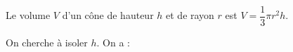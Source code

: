 
Le volume $V$ d'un cône de hauteur $h$ et de rayon $r$ est $V=\dfrac{1}{3}\pi r^2 h$.

On cherche à isoler $h$. On a :

\smallskip

